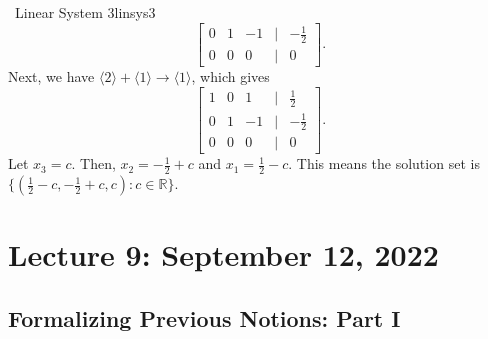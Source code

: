 \begin{example}{\Difficulty\,\Difficulty\,\,Linear System 3}{linsys3}
\begin{equation*}
\begin{bmatrix}
                 0 & 1 & -1 & | & -\frac{1}{2} \\
                 0 & 0 & 0 & | & 0
            \end{bmatrix}.
        \end{equation*}
        Next, we have \(\langle2\rangle+\langle1\rangle\to\langle1\rangle\), which gives
        \begin{equation*}
            \begin{bmatrix}
                 1 & 0 & 1 & | & \frac{1}{2} \\
                 0 & 1 & -1 & | & -\frac{1}{2} \\
                 0 & 0 & 0 & | & 0
            \end{bmatrix}.
        \end{equation*}
        Let \(x_3=c\). Then, \(x_2=-\frac{1}{2}+c\) and \(x_1=\frac{1}{2}-c\). This means the solution set is \(\{\left(\frac{1}{2}-c,-\frac{1}{2}+c,c\right):c\in\mathbb{R}\}\).
    \end{example}

\pagebreak

\section{Lecture 9: September 12, 2022}

    \subsection{Formalizing Previous Notions: Part I}


